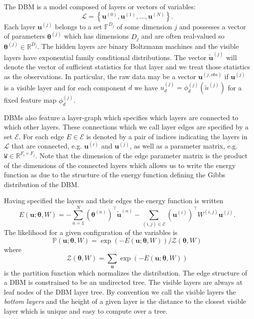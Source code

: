 \documentclass{article} %
\begin{document}
The DBM is a model composed of layers or vectors of variables:
\begin{equation}
\mathcal{L}=\left\{\mathbf{u}^{(0)},\mathbf{u}^{(1)},\ldots,\mathbf{u}^{(N)}\right\}.
\end{equation}
Each layer $\mathbf{u}^{(j)}$ belongs to a set $\mathbb{F}^{D_j}$ of some dimension $j$ and possesses
a vector of parameters $\boldsymbol{\theta}^{(j)}$ which has dimensions $D_j$ and are often real-valued
so $\boldsymbol{\theta}^{(j)}\in\mathbb{R}^{D_j}$.  The hidden layers are binary Boltzmann machines
and the visible layers have exponential family conditional distributions.  The vector $\tilde{\mathbf{u}}^{(j)}$ will
denote the vector of sufficient statistics for that layer and we treat those
statistics as the observations.  In particular, the raw data may be a vector $\mathbf{u}^{(j,obs)}$ if $\mathbf{u}^{(j)}$
is a visible layer and for each component $d$ we have
$u^{(j)}_d=\phi_d^{(j)}(\tilde{u}^{(j)})$ for a fixed feature map $\phi_d^{(j)}$.

DBMs also feature a layer-graph which specifies which layers are
connected to which other layers.  These connections which we call
layer edges are specified by a set $\mathcal{E}$.  For each edge
$E\in\mathcal{E}$ is denoted by a pair of indices indicating the
layers in $\mathcal{L}$ that are connected, e.g. $\mathbf{u}^{(i)}$
and $\mathbf{u}^{(j)}$, as well as a parameter matrix,
e.g. $\mathtt{W}\in \mathbb{R}^{F_i\times F_j}$.  Note that the
dimension of the edge parameter matrix is the product of the
dimensions of the connected layers which allows us to write the energy function as due to the structure of the energy
function defining the Gibbs distribution of the DBM.

Having specified the layers and their edges the energy function is written
\begin{equation}
E(\mathbf{u}; \boldsymbol{\theta},W)= -\sum_{n=1}^N (\boldsymbol{\theta}^{(n)})^\top\tilde{\mathbf{u}}^{(n)} 
- \sum_{(i,j)\in\mathcal{E}} (\mathbf{u}^{(i)})^\top W^{(i,j)}\mathbf{u}^{(j)}.
\end{equation}
The likelihood for a given configuration of the variables is
\begin{equation}
\mathbb{P}(\mathbf{u}; \boldsymbol{\theta},W) = \exp(-E(\mathbf{u};\boldsymbol{\theta},W))/\mathcal{Z}(\boldsymbol{\theta},W)
\end{equation}
where 
\begin{equation}
\mathcal{Z}(\boldsymbol{\theta},W)=\sum_{\mathbf{u}} \exp(-E(\mathbf{u};\boldsymbol{\theta},W))
\end{equation}
is the partition function which normalizes the distribution.
The edge structure of a DBM is constrained to be an undirected tree.  The visible layers are always at leaf nodes
of the DBM layer tree.  By convention we call the visible layers the {\it bottom layers} and the height of a given
layer is the distance to the closest visible layer which is unique and easy to compute over a tree.
\end{document}
